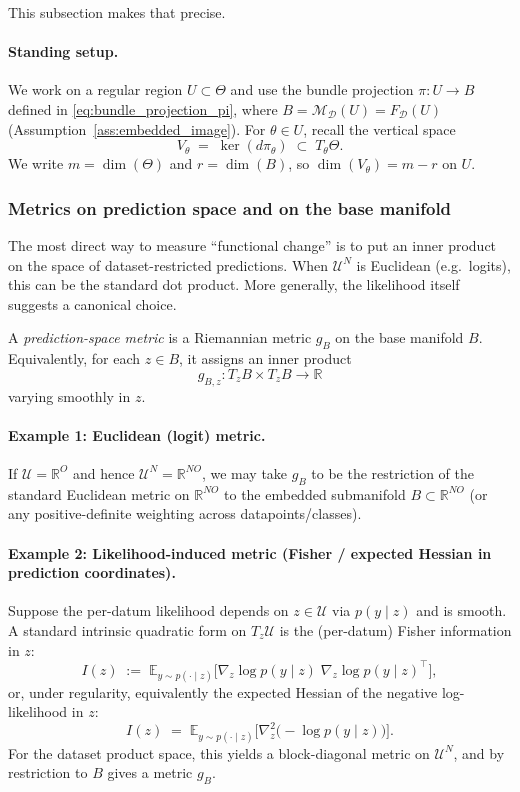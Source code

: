 This subsection makes that precise.

\paragraph{Standing setup.}
We work on a regular region $U\subset\Theta$ and use the bundle projection
$\pi:U\to B$ defined in \eqref{eq:bundle_projection_pi}, where $B=\mathcal M_{\mathcal D}(U)=F_{\mathcal D}(U)$
(Assumption~\ref{ass:embedded_image}).
For $\theta\in U$, recall the vertical space
\[
V_\theta \;=\;\ker(d\pi_\theta)\;\subset\;T_\theta\Theta.
\]
We write $m=\dim(\Theta)$ and $r=\dim(B)$, so $\dim(V_\theta)=m-r$ on $U$.

\subsubsection{Metrics on prediction space and on the base manifold}

The most direct way to measure ``functional change'' is to put an inner product on the space
of dataset-restricted predictions.  When $\mathcal U^N$ is Euclidean (e.g.\ logits), this can be
the standard dot product.  More generally, the likelihood itself suggests a canonical choice.

\begin{gdefn}
\label{def:prediction_metric}
A \emph{prediction-space metric} is a Riemannian metric $g_B$ on the base manifold $B$.
Equivalently, for each $z\in B$, it assigns an inner product
\[
g_{B,z}:T_zB\times T_zB\to\mathbb R
\]
varying smoothly in $z$.
\end{gdefn}

\paragraph{Example 1: Euclidean (logit) metric.}
If $\mathcal U=\mathbb R^O$ and hence $\mathcal U^N=\mathbb R^{NO}$, we may take
$g_B$ to be the restriction of the standard Euclidean metric on $\mathbb R^{NO}$ to the embedded
submanifold $B\subset\mathbb R^{NO}$ (or any positive-definite weighting across datapoints/classes).

\paragraph{Example 2: Likelihood-induced metric (Fisher / expected Hessian in prediction coordinates).}
Suppose the per-datum likelihood depends on $z\in\mathcal U$ via $p(y\mid z)$ and is smooth.
A standard intrinsic quadratic form on $T_z\mathcal U$ is the (per-datum) Fisher information in $z$:
\[
I(z)\;:=\;\mathbb E_{y\sim p(\cdot\mid z)}\!\bigl[ \nabla_z \log p(y\mid z)\;\nabla_z \log p(y\mid z)^\top \bigr],
\]
or, under regularity, equivalently the expected Hessian of the negative log-likelihood in $z$:
\[
I(z)\;=\;\mathbb E_{y\sim p(\cdot\mid z)}\!\bigl[ \nabla_z^2\bigl(-\log p(y\mid z)\bigr)\bigr].
\]
For the dataset product space, this yields a block-diagonal metric on $\mathcal U^N$, and by restriction
to $B$ gives a metric $g_B$.

